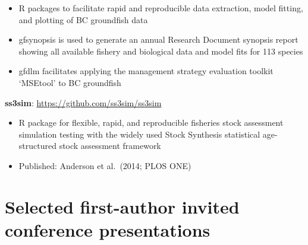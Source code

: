 \begin{itemize}
\tightlist
\item
  R packages to facilitate rapid and reproducible data extraction, model
  fitting, and plotting of BC groundfish data
\item
  gfsynopsis is used to generate an annual Research Document synopsis
  report showing all available fishery and biological data and model
  fits for 113 species
\item
  gfdlm facilitates applying the management strategy evaluation toolkit
  `MSEtool' to BC groundfish
\end{itemize}

\textbf{ss3sim}: \url{https://github.com/ss3sim/ss3sim}

\begin{itemize}
\tightlist
\item
  R package for flexible, rapid, and reproducible fisheries stock
  assessment simulation testing with the widely used Stock Synthesis
  statistical age-structured stock assessment framework
\item
  Published: Anderson et al.\ (2014; PLOS ONE)
\end{itemize}

\section{Selected first-author invited conference
presentations}\label{selected-first-author-invited-conference-presentations}

